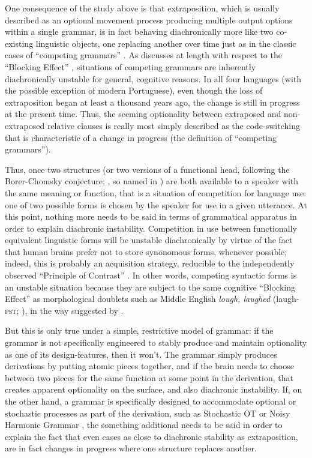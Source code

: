 One consequence of the study above is that extraposition, which is usually described as an optional movement process producing multiple output options within a single grammar, is in fact behaving diachronically more like two co-existing linguistic objects, one replacing another over time just as in the classic cases of ``competing grammars'' \citep[][etc.]{kroch1989, kroch1994, santorini1992}. As \citet{kroch1994} discusses at length with respect to the ``Blocking Effect'' \citep[an expanded understanding of the principle first proposed in ]{aronoff1976}, situations of competing grammars are inherently diachronically unstable for general, cognitive reasons. In all four languages (with the possible exception of modern Portuguese), even though the loss of extraposition began at least a thousand years ago, the change is still in progress at the present time. Thus, the seeming optionality between extraposed and non-extraposed relative clauses is really most simply described as the code-switching that is characteristic of a change in progress (the definition of ``competing grammars'').

Thus, once two structures (or two versions of a functional head, following the Borer-Chomsky conjecture; \citealt{borer1984, kroch1994}, so named in \citealt{baker2008}) are both available to a speaker with the same meaning or function, that is a situation of competition for language use: one of two possible forms is chosen by the speaker for use in a given utterance. At this point, nothing more needs to be said in terms of grammatical apparatus in order to explain diachronic instability. Competition in use between functionally equivalent linguistic forms will be unstable diachronically by virtue of the fact that human brains prefer not to store synonomous forms, whenever possible; indeed, this is probably an acquisition strategy, reducible to the independently observed ``Principle of Contrast'' \citep[][inter alia]{clark1987, clark1990}. In other words, competing syntactic forms is an unstable situation because they are subject to the same cognitive ``Blocking Effect'' as morphological doublets such as Middle English \textsl{lough, laughed} (laugh-\textsc{pst}; \citealt{taylor1994}), in the way suggested by \citet{kroch1994}.  

But this is only true under a simple, restrictive model of grammar: if the grammar is not specifically engineered to stably produce and maintain optionality as one of its design-features, then it won't. The grammar simply produces derivations by putting atomic pieces together, and if the brain needs to choose between two pieces for the same function at some point in the derivation, that creates apparent optionality on the surface, and also diachronic instability. If, on the other hand, a grammar is specifically designed to accommodate optional or stochastic processes as part of the derivation, such as Stochastic OT \citep{boersmahayes2001} or Noisy Harmonic Grammar \citep[][and much subsequent work]{boersmapater2008, pater2008}, the something additional needs to be said in order to explain the fact that even cases as close to diachronic stability as extraposition, are in fact changes in progress where one structure replaces another.

